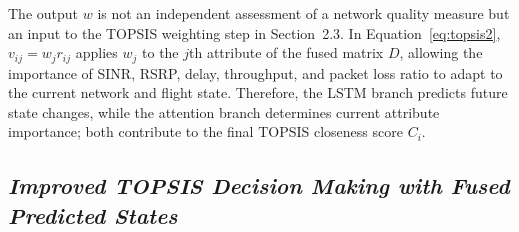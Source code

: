 \documentclass[10pt,a4paper]{article}
\begin{document}
The output $w$ is not an independent assessment of a network quality measure but an input to the TOPSIS weighting step in Section~2.3. In Equation~\eqref{eq:topsis2}, $v_{ij}=w_jr_{ij}$ applies $w_j$ to the $j$th attribute of the fused matrix $D$, allowing the importance of SINR, RSRP, delay, throughput, and packet loss ratio to adapt to the current network and flight state. Therefore, the LSTM branch predicts future state changes, while the attention branch determines current attribute importance; both contribute to the final TOPSIS closeness score $C_i$.

\subsection{\textit{Improved TOPSIS Decision Making with Fused Predicted States}}
\end{document}
